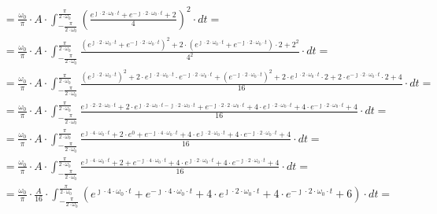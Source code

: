 \begin{task}
\begin{align*}
&=\frac{\omega_0}{\pi} \cdot A \cdot \int_{-\frac{\pi}{2\cdot\omega_0}}^{\frac{\pi}{2\cdot\omega_0}} \left(  \frac{e^{\jmath \cdot 2 \cdot \omega_0 \cdot t}+e^{-\jmath \cdot 2 \cdot \omega_0 \cdot t}+2}{4} \right)^2 \cdot dt=\\
&=\frac{\omega_0}{\pi} \cdot A \cdot \int_{-\frac{\pi}{2\cdot\omega_0}}^{\frac{\pi}{2\cdot\omega_0}} \frac{\left(e^{\jmath \cdot 2 \cdot \omega_0 \cdot t}+e^{-\jmath \cdot 2 \cdot \omega_0 \cdot t}\right)^2+2\cdot \left(e^{\jmath \cdot 2 \cdot \omega_0 \cdot t}+e^{-\jmath \cdot 2 \cdot \omega_0 \cdot t}\right) \cdot 2 + 2^2}{4^2} \cdot dt=\\
&=\frac{\omega_0}{\pi} \cdot A \cdot \int_{-\frac{\pi}{2\cdot\omega_0}}^{\frac{\pi}{2\cdot\omega_0}} \frac{\left(e^{\jmath \cdot 2 \cdot \omega_0 \cdot t}\right)^2+2\cdot e^{\jmath \cdot 2 \cdot \omega_0 \cdot t}\cdot e^{-\jmath \cdot 2 \cdot \omega_0 \cdot t} +\left(e^{-\jmath \cdot 2 \cdot \omega_0 \cdot t}\right)^2+2\cdot e^{\jmath \cdot 2 \cdot \omega_0 \cdot t}\cdot 2 +2\cdot e^{-\jmath \cdot 2 \cdot \omega_0 \cdot t} \cdot 2 + 4}{16} \cdot dt=\\
&=\frac{\omega_0}{\pi} \cdot A \cdot \int_{-\frac{\pi}{2\cdot\omega_0}}^{\frac{\pi}{2\cdot\omega_0}} \frac{e^{\jmath \cdot 2 \cdot 2 \cdot \omega_0 \cdot t}+2\cdot e^{\jmath \cdot 2 \cdot \omega_0 \cdot t -\jmath \cdot 2 \cdot \omega_0 \cdot t} +e^{-\jmath \cdot 2 \cdot 2 \cdot \omega_0 \cdot t} +4\cdot e^{\jmath \cdot 2 \cdot \omega_0 \cdot t} +4\cdot e^{-\jmath \cdot 2 \cdot \omega_0 \cdot t} + 4}{16} \cdot dt=\\
&=\frac{\omega_0}{\pi} \cdot A \cdot \int_{-\frac{\pi}{2\cdot\omega_0}}^{\frac{\pi}{2\cdot\omega_0}} \frac{e^{\jmath \cdot 4 \cdot \omega_0 \cdot t}+2\cdot e^{0} +e^{-\jmath \cdot 4 \cdot \omega_0 \cdot t} +4\cdot e^{\jmath \cdot 2 \cdot \omega_0 \cdot t} +4\cdot e^{-\jmath \cdot 2 \cdot \omega_0 \cdot t} + 4}{16} \cdot dt=\\
&=\frac{\omega_0}{\pi} \cdot A \cdot \int_{-\frac{\pi}{2\cdot\omega_0}}^{\frac{\pi}{2\cdot\omega_0}} \frac{e^{\jmath \cdot 4 \cdot \omega_0 \cdot t}+2 +e^{-\jmath \cdot 4 \cdot \omega_0 \cdot t} +4\cdot e^{\jmath \cdot 2 \cdot \omega_0 \cdot t} +4\cdot e^{-\jmath \cdot 2 \cdot \omega_0 \cdot t} + 4}{16} \cdot dt=\\
&=\frac{\omega_0}{\pi} \cdot \frac{A}{16} \cdot \int_{-\frac{\pi}{2\cdot\omega_0}}^{\frac{\pi}{2\cdot\omega_0}} \left( e^{\jmath \cdot 4 \cdot \omega_0 \cdot t}+e^{-\jmath \cdot 4 \cdot \omega_0 \cdot t} +4\cdot e^{\jmath \cdot 2 \cdot \omega_0 \cdot t} +4\cdot e^{-\jmath \cdot 2 \cdot \omega_0 \cdot t} + 6\right)\cdot dt=\\

\end{align*}
\end{task}
